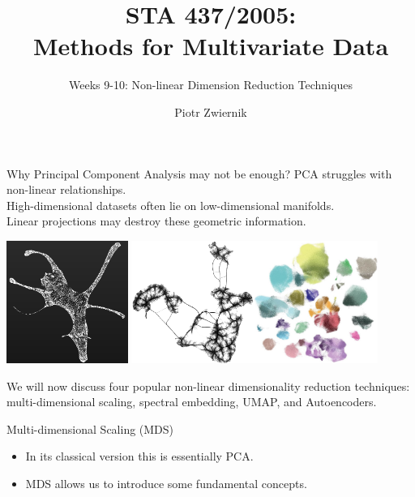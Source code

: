 \documentclass[11pt,handout,aspectratio=169]{beamer}
\title[STA437-Week1]{STA 437/2005: \\ Methods for Multivariate Data}
\subtitle[]{Weeks 9-10: Non-linear Dimension Reduction Techniques}
\author[Piotr Zwiernik]{Piotr Zwiernik}
\institute[UofT]{University of Toronto}
\date{}
\begin{document}
\maketitle


\begin{frame}{Why Principal Component Analysis may not be enough?}
  PCA struggles with non-linear relationships. \\[2mm]
  High-dimensional datasets often lie on low-dimensional manifolds. \\[2mm]
  Linear projections may destroy these geometric information.
  \begin{center}
 \includegraphics[height=4cm]{pics/exUMAP1}  \includegraphics[height=4cm]{pics/exUMAP2}\includegraphics[height=4cm]{pics/exUMAP3}	
  \end{center}
  We will now discuss four popular non-linear dimensionality reduction techniques: multi-dimensional scaling, spectral embedding, UMAP, and Autoencoders.
 \end{frame}

\begin{frame}{}
	\begin{center}
		\alert{\Huge Multi-dimensional Scaling (MDS)}
	\end{center}
	\begin{itemize}
		\item In its classical version this is essentially PCA.
		\item MDS allows us to introduce some fundamental concepts.
	\end{itemize}
\end{frame}
\end{document}
